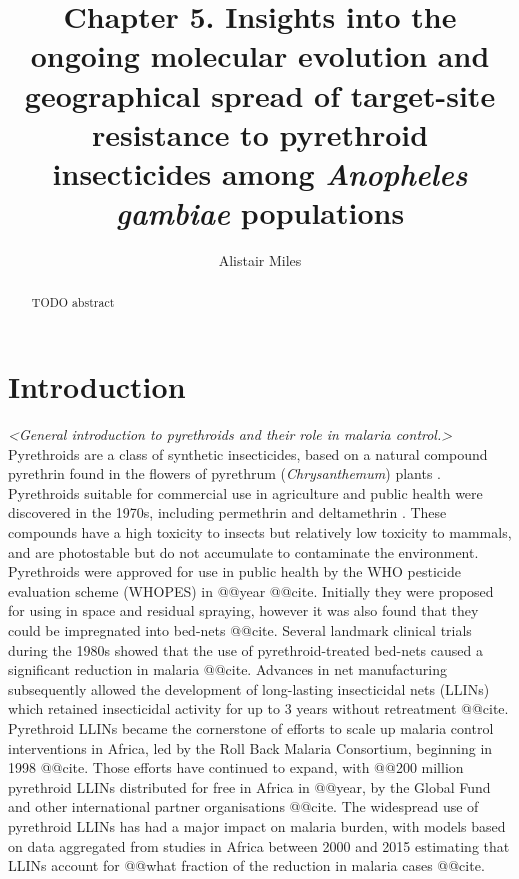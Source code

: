 \documentclass[a4paper,11pt,abstracton,hidelinks]{scrartcl}
\title{Chapter 5. Insights into the ongoing molecular evolution and geographical spread of target-site resistance to pyrethroid insecticides among \textit{Anopheles gambiae} populations}
\author[1,2]{\small Alistair Miles}
\affil[1]{\footnotesize Big Data Institute, University of Oxford, Li Ka Shing Centre for Health Information and Discovery, Old Road Campus, Oxford OX3 7LF}
\affil[2]{\footnotesize Wellcome Sanger Institute, Hinxton, Cambridge CB10 1SA}
\begin{document}
\maketitle


\begin{abstract}


TODO abstract


\end{abstract}


\section*{Introduction}


\textit{<General introduction to pyrethroids and their role in malaria control.>}
%
Pyrethroids are a class of synthetic insecticides, based on a natural compound pyrethrin found in the flowers of pyrethrum (\textit{Chrysanthemum}) plants \autocite{Elliott1989}.
%
Pyrethroids suitable for commercial use in agriculture and public health were discovered in the 1970s, including permethrin \autocite{Elliott1973} and deltamethrin \autocite{Elliott1974}.
%
These compounds have a high toxicity to insects but relatively low toxicity to mammals, and are photostable but do not accumulate to contaminate the environment.
%
Pyrethroids were approved for use in public health by the WHO pesticide evaluation scheme (WHOPES) in @@year @@cite.
%
Initially they were proposed for using in space and residual spraying, however it was also found that they could be impregnated into bed-nets @@cite.
%
Several landmark clinical trials during the 1980s showed that the use of pyrethroid-treated bed-nets caused a significant reduction in malaria @@cite.
%
Advances in net manufacturing subsequently allowed the development of long-lasting insecticidal nets (LLINs) which retained insecticidal activity for up to 3 years without retreatment @@cite.
%
Pyrethroid LLINs became the cornerstone of efforts to scale up malaria control interventions in Africa, led by the Roll Back Malaria Consortium, beginning in 1998 @@cite.
%
Those efforts have continued to expand, with @@200 million pyrethroid LLINs distributed for free in Africa in @@year, by the Global Fund and other international partner organisations @@cite.
%
The widespread use of pyrethroid LLINs has had a major impact on malaria burden, with models based on data aggregated from studies in Africa between 2000 and 2015 estimating that LLINs account for @@what fraction of the reduction in malaria cases @@cite.
\end{document}
